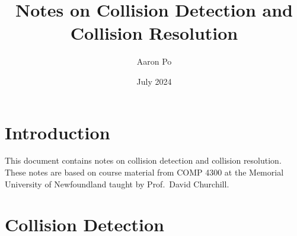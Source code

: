 \documentclass[10pt,a4paper]{article}
\author{Aaron Po}
\begin{document}
\title{Notes on Collision Detection and Collision Resolution}
\date{July 2024}

\section{Introduction}
This document contains notes on collision detection and collision resolution.
These notes are based on course material from COMP 4300 at the Memorial
University of Newfoundland taught by Prof.\ David Churchill.

\section{Collision Detection}
\end{document}
